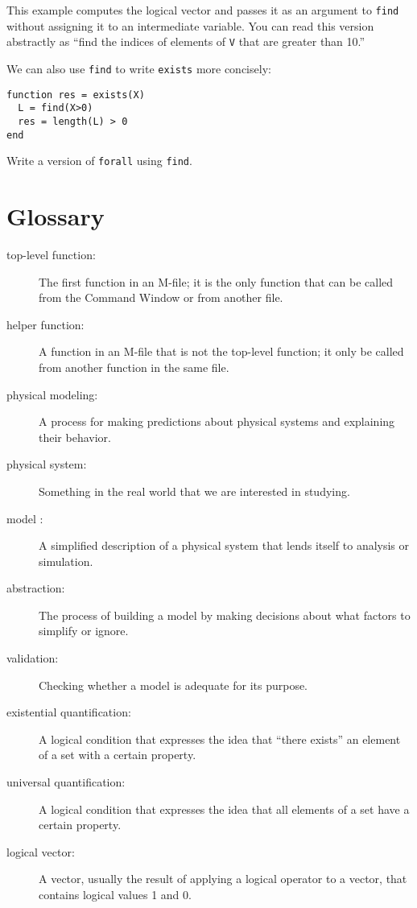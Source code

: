 This example computes the logical vector and passes it as an
argument to {\tt find} without assigning it to an intermediate
variable. You can read this version abstractly as ``find
the indices of elements of {\tt V} that are greater than 10.''

We can also use {\tt find} to write {\tt exists} more concisely:

\begin{verbatim}
function res = exists(X)
  L = find(X>0)
  res = length(L) > 0
end
\end{verbatim}

\begin{ex}
Write a version of {\tt forall} using {\tt find}.
\end{ex}


\section{Glossary}

\begin{description}

\item[top-level function:] The first function in an M-file;
it is the only function that can be called from the Command
Window or from another file.

\item[helper function:] A function in an M-file that is not
the top-level function; it only be called from another function
in the same file.

\item[physical modeling:] A process
for making predictions about physical systems and explaining their
behavior.

\item[physical system:] Something in the real world that we are
interested in studying.

\item[model :] A simplified description of a
physical system that lends itself to analysis or simulation.

\item[abstraction:] The process of building a model by making
decisions about what factors to simplify or ignore.

\item[validation:] Checking whether a model is adequate for its
purpose.

\item[existential quantification:] A logical condition that expresses
the idea that ``there exists'' an element of a set with a certain
property.

\item[universal quantification:] A logical condition that expresses
the idea that all elements of a set have a certain property.

\item[logical vector:] A vector, usually the result of applying a logical
operator to a vector, that contains logical values 1 and 0. 


\end{description}


